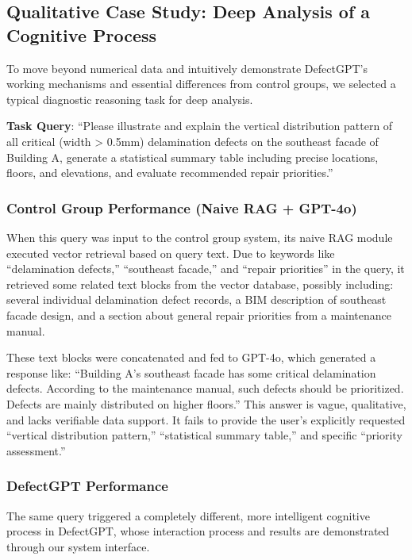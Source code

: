 \subsection{Qualitative Case Study: Deep Analysis of a Cognitive Process}

To move beyond numerical data and intuitively demonstrate DefectGPT's working mechanisms and essential differences from control groups, we selected a typical diagnostic reasoning task for deep analysis.

\textbf{Task Query}: ``Please illustrate and explain the vertical distribution pattern of all critical (width > 0.5mm) delamination defects on the southeast facade of Building A, generate a statistical summary table including precise locations, floors, and elevations, and evaluate recommended repair priorities.''

\subsubsection{Control Group Performance (Naive RAG + GPT-4o)}

When this query was input to the control group system, its naive RAG module executed vector retrieval based on query text. Due to keywords like ``delamination defects,'' ``southeast facade,'' and ``repair priorities'' in the query, it retrieved some related text blocks from the vector database, possibly including: several individual delamination defect records, a BIM description of southeast facade design, and a section about general repair priorities from a maintenance manual.

These text blocks were concatenated and fed to GPT-4o, which generated a response like: ``Building A's southeast facade has some critical delamination defects. According to the maintenance manual, such defects should be prioritized. Defects are mainly distributed on higher floors.'' This answer is vague, qualitative, and lacks verifiable data support. It fails to provide the user's explicitly requested ``vertical distribution pattern,'' ``statistical summary table,'' and specific ``priority assessment.''

\subsubsection{DefectGPT Performance}

The same query triggered a completely different, more intelligent cognitive process in DefectGPT, whose interaction process and results are demonstrated through our system interface.

